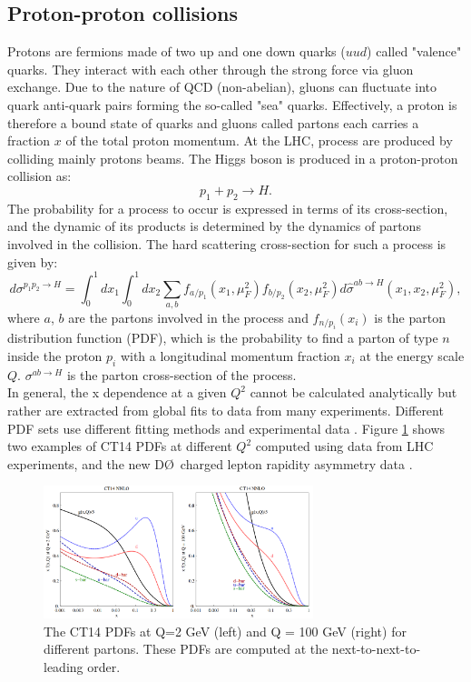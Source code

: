\subsection{Proton-proton collisions}
\label{chap1:H2012:PP}
Protons are fermions made of two up and one down quarks ($uud$) called "valence" quarks. They interact with each other through the strong force via gluon exchange. Due to the nature of QCD (non-abelian), gluons can fluctuate into quark anti-quark pairs forming the so-called "sea" quarks. Effectively, a proton is therefore a bound state of quarks and gluons called partons each carries a fraction $x$ of the total proton momentum. At the LHC, process are produced by colliding mainly protons beams. The Higgs boson is produced in a proton-proton collision as:
\begin{equation}
    p_1 + p_2 \rightarrow H.
\end{equation}
The probability for a process to occur is expressed in terms of its cross-section, and the dynamic of its products is determined by the dynamics of partons involved in the collision. The hard scattering cross-section for such a process is given by:
\begin{equation}
    d \sigma^{p_{1} p_{2} \rightarrow H}=\int_{0}^{1} d x_{1} \int_{0}^{1} d x_{2} \sum_{a, b} f_{a / p_{1}}\left(x_{1}, \mu_{F}^{2}\right) f_{b / p_{2}}\left(x_{2}, \mu_{F}^{2}\right) d \hat{\sigma}^{a b \rightarrow H}\left(x_1, x_2, \mu_{F}^{2}\right), 
\end{equation}
where $a$, $b$ are the partons involved in the process and $f_{n/p_i}(x_i)$ is the parton distribution function (PDF), which is the probability to find a parton of type $n$ inside the proton $p_i$ with a longitudinal momentum fraction $x_i$ at the energy scale $Q$. $\sigma^{a b \rightarrow H}$ is the parton cross-section of the process. \\
In general, the x dependence at a given $Q^2$ cannot be calculated analytically but rather are extracted from global fits to data from many experiments. Different PDF sets use different fitting methods and experimental data \cite{PDF}. Figure \ref{fig:chap1:H2012:PDF} shows two examples of CT14 PDFs at different $Q^2$ computed using data from LHC experiments, and the new D\O \ charged lepton rapidity asymmetry data \cite{CT14}. 
\begin{figure}[htbp]
    \centering
    \includegraphics[width=0.7\textwidth]{Ch1/Img/pdf_CT14_NNLO.png}
    \caption{The CT14 PDFs at Q=2 GeV (left) and Q = 100 GeV (right) for different partons. These PDFs are computed at the next-to-next-to-leading order.}
    \label{fig:chap1:H2012:PDF}
\end{figure}
